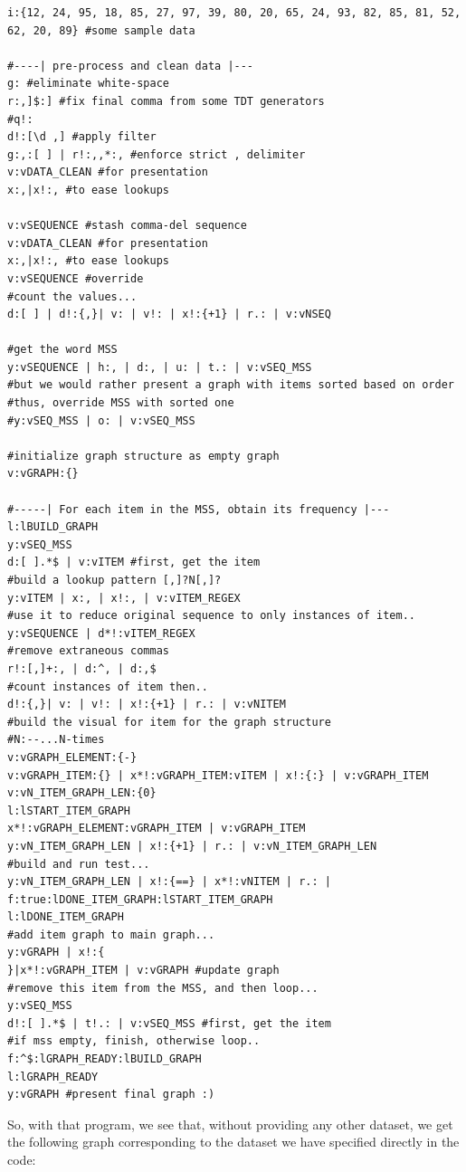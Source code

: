 \documentclass[a4paper, 18pt]{book} %
\begin{document}
  \begin{tcolorbox}[teaterminalstyle, title=A Bar-GRAPH Generator, breakable]
  \begin{lstlisting}[language=TEA,breaklines=true,]
i:{12, 24, 95, 18, 85, 27, 97, 39, 80, 20, 65, 24, 93, 82, 85, 81, 52, 62, 20, 89} #some sample data

#----| pre-process and clean data |---
g: #eliminate white-space
r:,]$:] #fix final comma from some TDT generators
#q!:
d!:[\d ,] #apply filter
g:,:[ ] | r!:,,*:, #enforce strict , delimiter
v:vDATA_CLEAN #for presentation
x:,|x!:, #to ease lookups

v:vSEQUENCE #stash comma-del sequence
v:vDATA_CLEAN #for presentation
x:,|x!:, #to ease lookups
v:vSEQUENCE #override
#count the values...
d:[ ] | d!:{,}| v: | v!: | x!:{+1} | r.: | v:vNSEQ

#get the word MSS
y:vSEQUENCE | h:, | d:, | u: | t.: | v:vSEQ_MSS
#but we would rather present a graph with items sorted based on order
#thus, override MSS with sorted one
#y:vSEQ_MSS | o: | v:vSEQ_MSS

#initialize graph structure as empty graph
v:vGRAPH:{}

#-----| For each item in the MSS, obtain its frequency |---
l:lBUILD_GRAPH
y:vSEQ_MSS
d:[ ].*$ | v:vITEM #first, get the item
#build a lookup pattern [,]?N[,]?
y:vITEM | x:, | x!:, | v:vITEM_REGEX
#use it to reduce original sequence to only instances of item..
y:vSEQUENCE | d*!:vITEM_REGEX
#remove extraneous commas
r!:[,]+:, | d:^, | d:,$
#count instances of item then..
d!:{,}| v: | v!: | x!:{+1} | r.: | v:vNITEM
#build the visual for item for the graph structure
#N:--...N-times
v:vGRAPH_ELEMENT:{-}
v:vGRAPH_ITEM:{} | x*!:vGRAPH_ITEM:vITEM | x!:{:} | v:vGRAPH_ITEM
v:vN_ITEM_GRAPH_LEN:{0}
l:lSTART_ITEM_GRAPH
x*!:vGRAPH_ELEMENT:vGRAPH_ITEM | v:vGRAPH_ITEM
y:vN_ITEM_GRAPH_LEN | x!:{+1} | r.: | v:vN_ITEM_GRAPH_LEN
#build and run test...
y:vN_ITEM_GRAPH_LEN | x!:{==} | x*!:vNITEM | r.: | f:true:lDONE_ITEM_GRAPH:lSTART_ITEM_GRAPH
l:lDONE_ITEM_GRAPH
#add item graph to main graph...
y:vGRAPH | x!:{
}|x*!:vGRAPH_ITEM | v:vGRAPH #update graph
#remove this item from the MSS, and then loop...
y:vSEQ_MSS
d!:[ ].*$ | t!.: | v:vSEQ_MSS #first, get the item
#if mss empty, finish, otherwise loop..
f:^$:lGRAPH_READY:lBUILD_GRAPH
l:lGRAPH_READY
y:vGRAPH #present final graph :)
   \end{lstlisting}
  \end{tcolorbox}


So, with that program, we see that, without providing any other dataset, we get the following graph corresponding to the dataset we have specified directly in the code:
\end{document}
